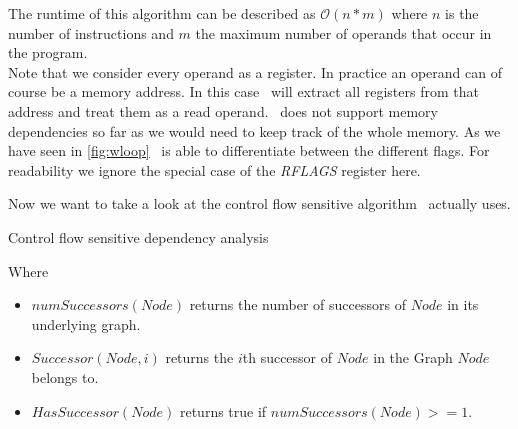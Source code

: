 The runtime of this algorithm can be described as $\mathcal{O}(n*m)$ where $n$ is the number of instructions and $m$ the maximum number of operands that occur in the program.\\

Note that we consider every operand as a register. In practice an operand can of course be a memory address. In this case \suaca\ will extract all registers from that address and treat them as a read operand. \suaca\ does not support memory dependencies so far as we would need to keep track of the whole memory. As we have seen in \autoref{fig:wloop} \suaca\ is able to differentiate between the different flags. For readability we ignore the special case of the \emph{RFLAGS} register here.

Now we want to take a look at the control flow sensitive algorithm \suaca\ actually uses. 
\newpage

\begin{algorithm}[H]
    \SetAlgoLined
    \caption{Control flow sensitive dependency analysis}
    \label{alg:dep}
\end{algorithm}

Where
\begin{itemize}
    \item $numSuccessors(Node)$ returns the number of successors of $Node$ in its underlying graph.
    \item $Successor(Node, i)$ returns the $i$th successor of $Node$ in the Graph $Node$ belongs to.
    \item $HasSuccessor(Node)$ returns true if $numSuccessors(Node) >= 1$.
\end{itemize}

